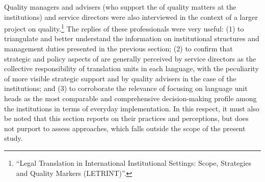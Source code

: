 \documentclass[output=paper]{langsci/langscibook}
\begin{document}
Quality managers and advisers (who support the  of quality matters at the  institutions) and service directors were also interviewed in the context of a larger project on  quality.\footnote{“Legal Translation in International Institutional Settings: Scope, Strategies and Quality Markers (LETRINT)”.} The replies of these professionals were very useful: (1) to triangulate and better understand the information on institutional structures and management duties presented in the previous section; (2) to confirm that strategic and policy aspects of  are generally perceived by service directors as the collective responsibility of translation units in each language, with the peculiarity of more visible strategic support and  by quality advisers in the case of the  institutions; and (3) to corroborate the relevance of focusing on language unit heads as the most comparable and comprehensive decision-making profile among the institutions in terms of everyday  implementation. In this respect, it must also be noted that this section reports on their practices and perceptions, but does not purport to assess  approaches, which falls outside the scope of the present study.  
\end{document}
